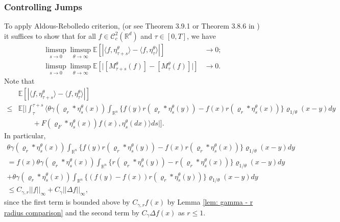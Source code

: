 \documentclass[12pt]{article}
\begin{document}
\subsubsection{Controlling Jumps}
To apply Aldous-Rebolledo criterion,
(or see Theorem 3.9.1 or Theorem 3.8.6 in \cite{EK})
it suffices to show that for all $f \in \mathcal{C}^2_{c}(\mathbb{R}^d)$
and $\tau \in [0,T]$, we have 
\begin{equation}
\begin{aligned}
\limsup_{s \to 0}\limsup_{\theta \to \infty}\mathbb{E}\left[\left| \langle f, \eta^{\theta}_{\tau+s}\rangle - \langle f, \eta^{\theta}_{\tau}\rangle \right|\right]& \to 0;\\
\limsup_{s \to 0}\limsup_{\theta \to \infty}\mathbb{E}\left[\big| [M^{\theta}_{\tau+s}(f)] - [M^{\theta}_{\tau}(f)] \big|\right]& \to 0.
\end{aligned}    
\end{equation}
Note that
\begin{equation}
\begin{aligned}
 & \mathbb{E}\left[\left| \langle f, \eta^{\theta}_{\tau+s}\rangle - \langle f, \eta^{\theta}_{\tau}\rangle \right|\right] \\
\leq & \mathbb{E}\Bigg[\bigg| \int_{\tau}^{\tau+s}\bigg\langle \theta\gamma(\varrho_{r}*\eta^{\theta}_{s}(x)) \int_{\mathbb{R}^n} \big\{f(y)r(\varrho_{r}*\eta^{\theta}_{s}(y))-f(x)r(\varrho_{r}*\eta^{\theta}_{s}(x))\big\}\varrho_{1/\theta}(x-y)dy \\
& \qquad + F(\varrho_{F}*\eta^{\theta}_{s}(x)) f(x),\eta^{\theta}_{s}(dx)  \bigg\rangle ds \bigg|\Bigg].
\end{aligned}
\end{equation}
In particular,
\begin{multline}
 \theta\gamma(\varrho_{r}*\eta^{\theta}_{s}(x))\int_{\mathbb{R}^n} \big\{f(y)r(\varrho_{r}*\eta^{\theta}_{s}(y))-f(x)r(\varrho_{r}*\eta^{\theta}_{s}(x))\big\}\varrho_{1/\theta}(x-y)dy \\
 =  f(x)\theta\gamma(\varrho_{r}*\eta^{\theta}_{s}(x))\int_{\mathbb{R}^n} \big\{r(\varrho_{r}*\eta^{\theta}_{s}(y))-r(\varrho_{r}*\eta^{\theta}_{s}(x))\big\}\varrho_{1/\theta}(x-y)dy\\
 + \theta\gamma(\varrho_{r}*\eta^{\theta}_{s}(x))\int_{\mathbb{R}^n} \big\{(f(y)-f(x))r(\varrho_{r}*\eta^{\theta}_{s}(y))\big\}\varrho_{1/\theta}(x-y)dy\\
 \leq C_{\gamma,r}||f||_{\infty} + C_{\gamma}||\Delta f||_{\infty},
\end{multline}
since the first term is bounded above by $C_{\gamma,r}f(x)$ by Lemma \ref{lem: gamma - r radius comparison}
and the second term by $C_{\gamma} \Delta f(x)$ as $r \leq 1$.
\end{document}
